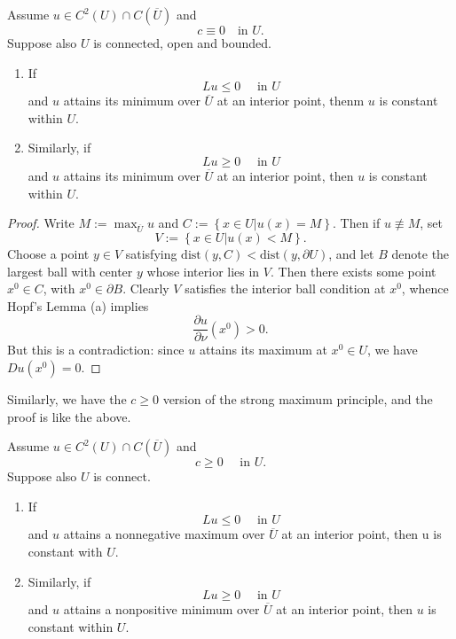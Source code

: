\begin{theorem}
  Assume $u\in C^2\left( U \right) \cap C\left( \overline{U} \right) $ and 
   \[
  c\equiv 0 \quad \text {in }U.
  \] 
  Suppose also $U$ is connected, open and bounded.
  \begin{enumerate}
    \item If 
      \[
      Lu\le 0 \quad \text{ in }U
      \] 
      and $u$ attains its minimum over $\overline{U}$ at an interior point, thenm $u$ is constant within $U$.
    \item Similarly, if 
      \[
      Lu\ge 0\quad \text{ in }U
      \] 
      and $u$ attains its minimum over $\overline{U}$ at an interior point, then $u$ is constant within $U$.
  \end{enumerate}
\end{theorem}
\begin{proof}
  Write $M:=\max_{\overline{U}}u$ and $C:=\left\{ x\in U\lvert u(x)=M \right\} $. Then if $u\not\equiv M$, set 
  \[
    V:=\left\{ x\in U\lvert u(x)<M \right\} .
  \] 
  Choose a point $y\in V$ satisfying $\text{dist}\left( y,C \right) <\text{dist}\left( y,\partial U \right) $, and let $B$ denote the largest ball with center $y$ whose interior lies in $V$. Then there exists some point $x^{0}\in C$, with $x^{0}\in \partial B$. Clearly $V$ satisfies the interior ball condition at $x^{0}$, whence Hopf's Lemma (a) implies 
  \[
    \frac{\partial u}{\partial \nu} \left( x^{0} \right) >0. 
  \] 
  But this is a contradiction: since $u$ attains its maximum at $x^{0}\in U$, we have $Du(x^{0})=0$.
\end{proof}
Similarly, we have the $c\ge 0$ version of the strong maximum principle, and the proof is like the above.
\begin{theorem}
  Assume $u\in C^{2}\left( U \right) \cap C\left( \overline{U} \right) $ and 
  \[
  c\ge 0 \quad \text{ in } U.
  \] 
  Suppose also $U$ is connect.
  \begin{enumerate}
    \item If 
       \[
      Lu\le 0 \quad \text{ in }U
      \] 
      and $u$ attains a nonnegative maximum over $\overline{U}$ at an interior point, then u is constant with $U$.
    \item Similarly, if 
       \[
      Lu\ge 0\quad \text{ in }U
      \] 
      and $u$ attains a nonpositive minimum over $\overline{U}$ at an interior point, then $u$ is constant within $U$.
  \end{enumerate}
\end{theorem}

